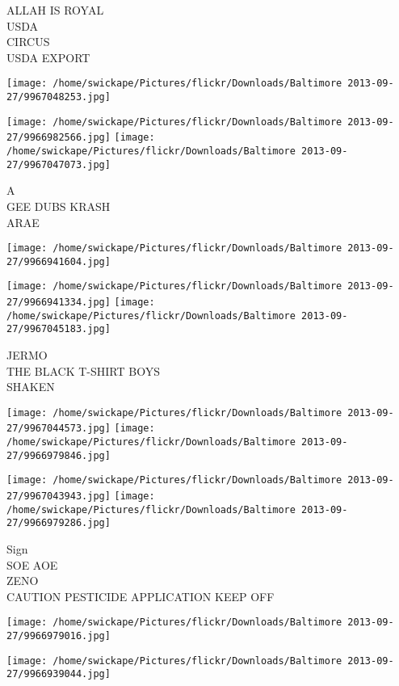 \documentclass[10pt,letterpaper]{article}
\begin{document}
ALLAH IS ROYAL\\
USDA\\
CIRCUS\\
USDA EXPORT
\pagebreak

\texttt{[image: /home/swickape/Pictures/flickr/Downloads/Baltimore 2013-09-27/9967048253.jpg]}

\vspace{0.25in}
\texttt{[image: /home/swickape/Pictures/flickr/Downloads/Baltimore 2013-09-27/9966982566.jpg]}
\texttt{[image: /home/swickape/Pictures/flickr/Downloads/Baltimore 2013-09-27/9967047073.jpg]}

A\\
GEE DUBS KRASH\\
ARAE
\pagebreak

\texttt{[image: /home/swickape/Pictures/flickr/Downloads/Baltimore 2013-09-27/9966941604.jpg]}

\vspace{0.25in}
\texttt{[image: /home/swickape/Pictures/flickr/Downloads/Baltimore 2013-09-27/9966941334.jpg]}
\texttt{[image: /home/swickape/Pictures/flickr/Downloads/Baltimore 2013-09-27/9967045183.jpg]}

JERMO\\
THE BLACK T{-}SHIRT BOYS\\
SHAKEN
\pagebreak

\texttt{[image: /home/swickape/Pictures/flickr/Downloads/Baltimore 2013-09-27/9967044573.jpg]}
\texttt{[image: /home/swickape/Pictures/flickr/Downloads/Baltimore 2013-09-27/9966979846.jpg]}

\texttt{[image: /home/swickape/Pictures/flickr/Downloads/Baltimore 2013-09-27/9967043943.jpg]}
\texttt{[image: /home/swickape/Pictures/flickr/Downloads/Baltimore 2013-09-27/9966979286.jpg]}

Sign\\
SOE AOE\\
ZENO\\
CAUTION PESTICIDE APPLICATION KEEP OFF
\pagebreak

\texttt{[image: /home/swickape/Pictures/flickr/Downloads/Baltimore 2013-09-27/9966979016.jpg]}

\vspace{0.25in}
\texttt{[image: /home/swickape/Pictures/flickr/Downloads/Baltimore 2013-09-27/9966939044.jpg]}
\end{document}
